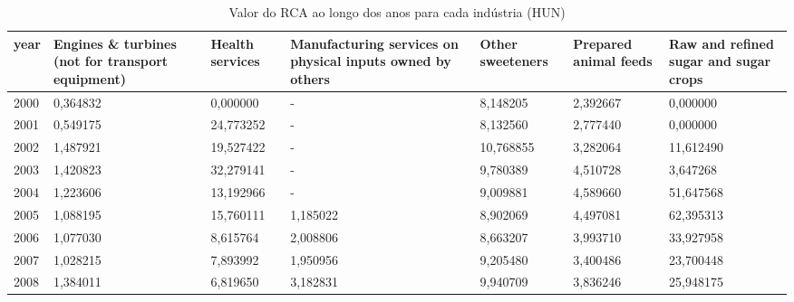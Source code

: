 \begin{table}
\centering
\caption{Valor do RCA ao longo dos anos para cada indústria (HUN)}
\begin{tabular}{p{1cm}p{2cm}p{2cm}p{2cm}p{2cm}p{2cm}p{2cm}}
\toprule
 year &  Engines \& turbines (not for transport equipment) &  Health services &  Manufacturing services on physical inputs owned by others &  Other sweeteners &  Prepared animal feeds &  Raw and refined sugar and sugar crops \\
\midrule
 2000 &                                          0,364832 &         0,000000 &                                                  - &          8,148205 &               2,392667 &                               0,000000 \\
 2001 &                                          0,549175 &        24,773252 &                                                  - &          8,132560 &               2,777440 &                               0,000000 \\
 2002 &                                          1,487921 &        19,527422 &                                                  - &         10,768855 &               3,282064 &                              11,612490 \\
 2003 &                                          1,420823 &        32,279141 &                                                  - &          9,780389 &               4,510728 &                               3,647268 \\
 2004 &                                          1,223606 &        13,192966 &                                                  - &          9,009881 &               4,589660 &                              51,647568 \\
 2005 &                                          1,088195 &        15,760111 &                                           1,185022 &          8,902069 &               4,497081 &                              62,395313 \\
 2006 &                                          1,077030 &         8,615764 &                                           2,008806 &          8,663207 &               3,993710 &                              33,927958 \\
 2007 &                                          1,028215 &         7,893992 &                                           1,950956 &          9,205480 &               3,400486 &                              23,700448 \\
 2008 &                                          1,384011 &         6,819650 &                                           3,182831 &          9,940709 &               3,836246 &                              25,948175 \\

\end{tabular}
\end{table}
